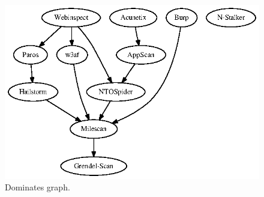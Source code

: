 \begin{figure}[tb]
  \centering
      \includegraphics[scale=1]{all_results_rank}
      \caption{Dominates graph.}
\end{figure}
